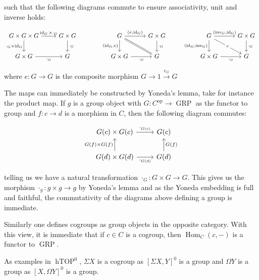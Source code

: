 \documentclass[12pt]{article}
\DeclareMathOperator{\id}{id}
\DeclareMathOperator{\Hom}{Hom}
\DeclareMathOperator{\op}{op}
\DeclareMathOperator{\hTOP}{hTOP}
\DeclareMathOperator{\GRP}{GRP}
\begin{document}
such that the following diagrams commute to ensure associativity, unit and inverse holds:

\[\begin{tikzcd}
	{G\times G\times G} & {G\times G} && G & {G\times G} && G & {G\times G}\\
	{G\times G} & G && {G\times G} & G && {G\times G} & G
	\arrow["{\cdot_G}"', from=2-1, to=2-2]
	\arrow["{\cdot_G}", from=1-2, to=2-2]
	\arrow["{\cdot_G\times \id_G}"', from=1-1, to=2-1]
	\arrow["{\id_G\times\cdot_G}", from=1-1, to=1-2]
	\arrow[Rightarrow, no head, from=1-4, to=2-5]
	\arrow["{\left(e,\id_G\right)}", from=1-4, to=1-5]
	\arrow["{\cdot_G}", from=1-5, to=2-5]
	\arrow["{\left(\id_G,\text{inv}_G\right)}"', from=1-7, to=2-7]
	\arrow["{\left(\text{inv}_G,\id_G\right)}", from=1-7, to=1-8]
	\arrow["{\cdot_G}", from=1-8, to=2-8]
	\arrow["{\cdot_G}"', from=2-7, to=2-8]
	\arrow["{\left(\id_G,e\right)}"', from=1-4, to=2-4]
	\arrow["{\cdot_G}"', from=2-4, to=2-5]
	\arrow["e"{description}, from=1-7, to=2-8]
\end{tikzcd}\]

where $e:G\to G$ is the composite morphism $G\to 1\overset{e_G}\to G$

The maps can immediately be constructed by Yoneda's lemma, take for instance the product map. If $g$ is a group object with $G:C^{\op}\to\GRP$ as the functor to group and $f:c\to d$ is a morphism in $C$, then the following diagram commutes:

\[\begin{tikzcd}
	{G(c)\times G(c)} & {G(c)} \\
	{G(d)\times G(d)} & {G(d)}
	\arrow["{\cdot_{G(d)}}"', from=2-1, to=2-2]
	\arrow["{\cdot_{G(c)}}", from=1-1, to=1-2]
	\arrow["{G(f)}"', from=2-2, to=1-2]
	\arrow["{G(f)\times G(f)}", from=2-1, to=1-1]
\end{tikzcd}\]

telling us we have a natural transformation $\cdot_G:G\times G\to G$. This gives us the morphism $\cdot_g:g\times g\to g$ by Yoneda's lemma and as the Yoneda embedding is full and faithful, the commutativity of the diagrams above defining a group is immediate.

Similarly one defines cogroups as group objects in the opposite category. With this view, it is immediate that if $c\in C$ is a cogroup, then $\Hom_C(c,-)$ is a functor to $\GRP$.

As examples in $\hTOP^0$, $\Sigma X$ is a cogroup as $\left[\Sigma X,Y\right]^0$ is a group and $\Omega Y$ is a group as $\left[X,\Omega Y\right]^0$ is a group.
\end{document}
